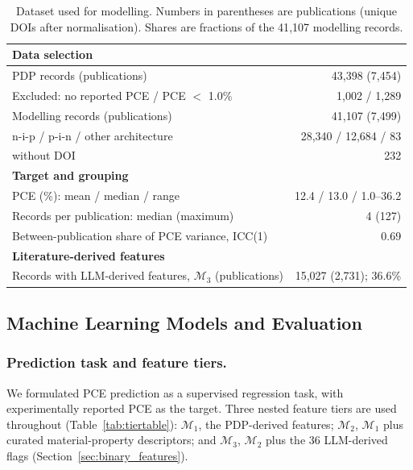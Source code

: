 \documentclass[3p]{elsarticle}
\begin{document}
\begin{table}[htbp]
    \centering\small
    \caption{Dataset used for modelling. Numbers in parentheses are publications (unique
    DOIs after normalisation). Shares are fractions of the 41{,}107 modelling records.}
    \label{tab:dataset}
    \begin{tabular}{@{}lr@{}}
        \toprule
        \textbf{Data selection} & \\
        \midrule
        PDP records (publications)                              & 43{,}398 (7{,}454) \\
        Excluded: no reported PCE / PCE $<$ 1.0\%               & 1{,}002 / 1{,}289 \\
        Modelling records (publications)                        & 41{,}107 (7{,}499) \\
        \quad n-i-p / p-i-n / other architecture                & 28{,}340 / 12{,}684 / 83 \\
        \quad without DOI                                        & 232 \\
        \midrule
        \textbf{Target and grouping} & \\
        \midrule
        PCE (\%): mean / median / range                         & 12.4 / 13.0 / 1.0--36.2 \\
        Records per publication: median (maximum)               & 4 (127) \\
        Between-publication share of PCE variance, ICC(1)       & 0.69 \\
        \midrule
        \textbf{Literature-derived features} & \\
        \midrule
        Records with LLM-derived features, $\mathcal{M}_3$ (publications) & 15{,}027 (2{,}731); 36.6\% \\
        \bottomrule
    \end{tabular}
\end{table}

\subsection{Machine Learning Models and Evaluation}

\subsubsection{Prediction task and feature tiers.}
\label{sec:tiers}
We formulated PCE prediction as a supervised regression task, with experimentally reported PCE as the target. Three nested feature tiers are used throughout (Table~\ref{tab:tiertable}): $\mathcal{M}_1$, the PDP-derived features; $\mathcal{M}_2$, $\mathcal{M}_1$ plus curated material-property descriptors; and $\mathcal{M}_3$, $\mathcal{M}_2$ plus the 36 LLM-derived flags (Section~\ref{sec:binary_features}).
\end{document}
